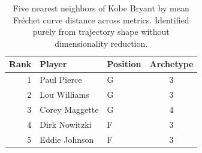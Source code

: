 \begin{table}[htbp]
  \centering\small
  \begin{tabular}{rllc}
    \toprule
    Rank & Player & Position & Archetype \\
    \midrule
    1 & Paul Pierce & G & 3 \\
    2 & Lou Williams & G & 3 \\
    3 & Corey Maggette & G & 4 \\
    4 & Dirk Nowitzki & F & 3 \\
    5 & Eddie Johnson & F & 3 \\
    \bottomrule
  \end{tabular}
  \caption{Five nearest neighbors of Kobe Bryant by mean Fr\'{e}chet curve distance across metrics. Identified purely from trajectory shape without dimensionality reduction.}
  \label{tab:Kobe_Bryant_frechet_curve_neighbors}
\end{table}

